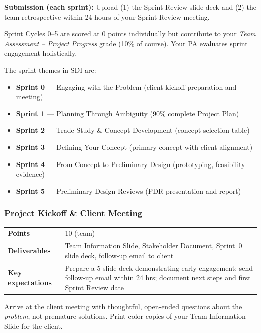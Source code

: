 \noindent\textbf{Submission (each sprint):} Upload (1) the Sprint Review slide deck and (2) the team retrospective within 24 hours of your Sprint Review meeting.

\begin{tipbox}
Sprint Cycles 0--5 are scored at 0 points individually but contribute to your \emph{Team Assessment -- Project Progress} grade (10\% of course). Your PA evaluates sprint engagement holistically.
\end{tipbox}

\noindent The sprint themes in SDI are:
\begin{itemize}[leftmargin=*]
  \item \textbf{Sprint 0} --- Engaging with the Problem (client kickoff preparation and meeting)
  \item \textbf{Sprint 1} --- Planning Through Ambiguity (90\% complete Project Plan)
  \item \textbf{Sprint 2} --- Trade Study \& Concept Development (concept selection table)
  \item \textbf{Sprint 3} --- Defining Your Concept (primary concept with client alignment)
  \item \textbf{Sprint 4} --- From Concept to Preliminary Design (prototyping, feasibility evidence)
  \item \textbf{Sprint 5} --- Preliminary Design Reviews (PDR presentation and report)
\end{itemize}

\subsubsection{Project Kickoff \& Client Meeting}
\label{sssec:kickoff}

\begin{tabularx}{\textwidth}{lX}
\toprule
\textbf{Points} & 10 (team) \\
\textbf{Deliverables} & Team Information Slide, Stakeholder Document, Sprint~0 slide deck, follow-up email to client \\
\textbf{Key expectations} & Prepare a 5-slide deck demonstrating early engagement; send follow-up email within 24 hrs; document next steps and first Sprint Review date \\
\bottomrule
\end{tabularx}

\begin{protip}
Arrive at the client meeting with thoughtful, open-ended questions about the \emph{problem}, not premature solutions. Print color copies of your Team Information Slide for the client.
\end{protip}

